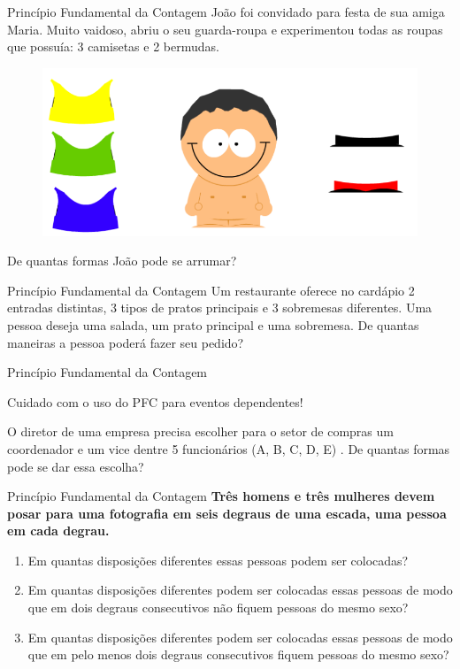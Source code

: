 \documentclass[aspectratio=169,xcolor=dvipsnames]{beamer}
\begin{document}
\begin{frame}{Princípio Fundamental da Contagem}
    João foi convidado para festa de sua amiga Maria. Muito vaidoso, abriu o seu guarda-roupa e experimentou todas as roupas que possuía:  3 camisetas e 2 bermudas.
      \begin{figure}[htb!]
        \centering
        \includegraphics[width=.5\linewidth]{images/im1.png}
      \end{figure}
    De quantas formas João pode se arrumar?

\end{frame}


\begin{frame}{Princípio Fundamental da Contagem}
    Um restaurante oferece no cardápio 2 entradas distintas, 3 tipos de pratos principais e 3 sobremesas diferentes.
    Uma pessoa deseja uma salada, um prato principal e uma sobremesa. De quantas maneiras a pessoa
    poderá fazer seu pedido?
\end{frame}



\begin{frame}{Princípio Fundamental da Contagem}
    \begin{center}
        Cuidado com o uso do PFC para eventos dependentes!
    \end{center}
    O diretor de uma empresa precisa escolher para o setor de compras um coordenador e um vice dentre 5 funcionários (A, B, C, D, E) . De quantas formas pode se dar essa escolha?
\end{frame}


\begin{frame}{Princípio Fundamental da Contagem}
    \textbf{Três homens e três mulheres devem posar para uma fotografia em seis degraus de uma escada, uma pessoa em cada degrau.}

    \begin{enumerate}
        \item Em quantas disposições diferentes essas pessoas podem ser colocadas?
        \item Em quantas disposições diferentes podem ser colocadas essas pessoas de modo
            que em dois degraus consecutivos não fiquem pessoas do mesmo sexo?
        \item Em quantas disposições diferentes podem ser colocadas essas pessoas de modo
            que em pelo menos dois degraus consecutivos fiquem pessoas do mesmo sexo?
    \end{enumerate}
\end{frame}
\end{document}
